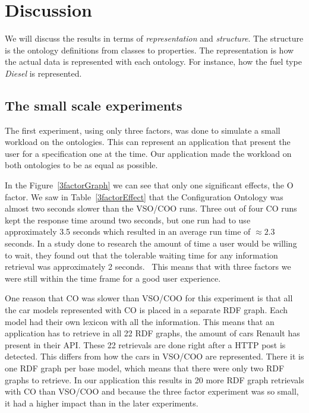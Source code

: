 \documentclass{llncs}
\begin{document}
\section{Discussion}

We will discuss the results in terms of \emph{representation} and
\emph{structure}. The structure is the ontology definitions from
classes to properties.  The representation is how the actual data is
represented with each ontology. For instance, how the fuel type
\emph{Diesel} is represented.

\subsection{The small scale experiments}
The first experiment, using only three factors, was done to simulate a
small workload on the ontologies. This can represent an application
that present the user for a specification one at the time. 
Our application made the workload on both ontologies to be as equal as
possible. 

In the Figure~\ref{3factorGraph} we can see that only one significant
effects, the O factor. We saw in Table~\ref{3factorEffect} that the
Configuration Ontology was almost two seconds slower than the VSO/COO
runs.  Three out of four CO runs kept the response time around two
seconds, but one run had to use approximately 3.5 seconds which
resulted in an average run time of $\approx2.3$ seconds.  In a study
done to research the amount of time a user would be willing to wait,
they found out that the tolerable waiting time for any information
retrieval was approximately 2 seconds.~\cite{waitTime} This means that
with three factors we were still within the time frame for a good user
experience.

One reason that CO was slower than VSO/COO for this experiment is that
all the car models represented with CO is placed in a separate RDF
graph. Each model had their own lexicon with all the information.
This means that an application has to retrieve in all 22 RDF graphs,
the amount of cars Renault has present in their API. These 22
retrievals are done right after a HTTP post is detected. This differs
from how the cars in VSO/COO are represented. There it is one RDF
graph per base model, which means that there were only two RDF graphs
to retrieve.  In our application this results in 20 more RDF graph
retrievals with CO than VSO/COO and because the three factor
experiment was so small, it had a higher impact than in the later
experiments.
\end{document}
